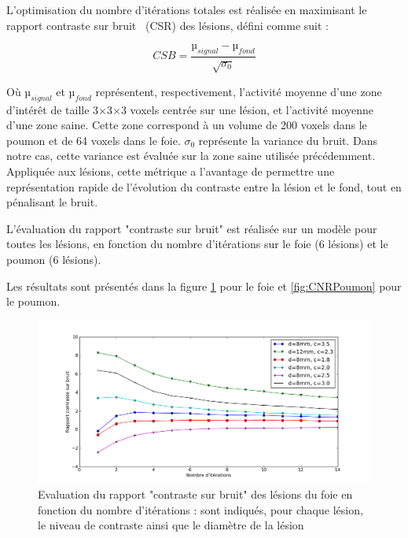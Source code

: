 L'optimisation du nombre d'itérations totales est réalisée en maximisant le rapport contraste sur bruit~\cite{takahara2004diffusion} (CSR) des lésions, défini comme suit :

\begin{equation}
 CSB = \frac{µ_{signal} - µ_{fond}}{\sqrt{\sigma_0}}
\end{equation}

Où $µ_{signal}$ et $µ_{fond}$ représentent, respectivement, l'activité moyenne d'une zone d'intérêt de taille 3$\times$3$\times$3 voxels centrée sur une lésion, et l'activité moyenne d'une zone saine. Cette zone correspond à un volume de 200 voxels dans le poumon et de 64 voxels dans le foie. $\sigma_0$ représente la variance du bruit. Dans notre cas, cette variance est évaluée sur la zone saine utilisée précédemment. Appliquée aux lésions, cette métrique a l'avantage de permettre une représentation rapide de l'évolution du contraste entre la lésion et le fond, tout en pénalisant le bruit.

L'évaluation du rapport "contraste sur bruit" est réalisée sur un modèle pour toutes les lésions, en fonction du nombre d'itérations sur le foie (6 lésions) et le poumon (6 lésions).

Les résultats sont présentés dans la figure \ref{fig:CNRFoie} pour le foie et \ref{fig:CNRPoumon} pour le poumon.

\begin{figure}
\centering
\includegraphics[width=17cm]{images/CNRFoie}
\caption[Evaluation du rapport contraste sur bruit des lésions du foie en fonction du nombre d'itérations]{Evaluation du rapport "contraste sur bruit" des lésions du foie en fonction du nombre d'itérations : sont indiqués, pour chaque lésion, le niveau de contraste ainsi que le diamètre de la lésion}
\label{fig:CNRFoie}
\end{figure}


